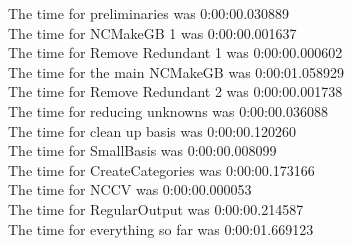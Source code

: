 \documentclass[rep10,leqno]{report}
\begin{document}
\noindent
The time for preliminaries was 0:00:00.030889\\
The time for NCMakeGB 1 was 0:00:00.001637\\
The time for Remove Redundant 1 was 0:00:00.000602\\
The time for the main NCMakeGB was 0:00:01.058929\\
The time for Remove Redundant 2 was 0:00:00.001738\\
The time for reducing unknowns was 0:00:00.036088\\
The time for clean up basis was 0:00:00.120260\\
The time for SmallBasis was 0:00:00.008099\\
The time for CreateCategories was 0:00:00.173166\\
The time for NCCV was 0:00:00.000053\\
The time for RegularOutput was 0:00:00.214587\\
The time for everything so far was 0:00:01.669123\\
\end{document}
